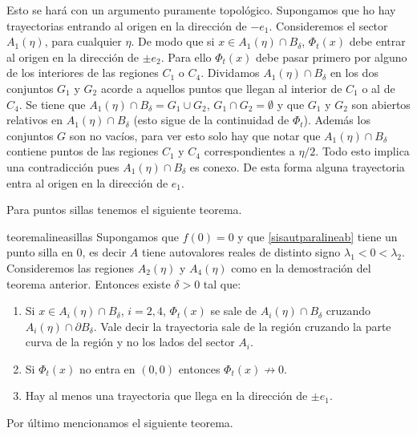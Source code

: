 \begin{demo}
 Esto se hará con
un argumento puramente topológico. Supongamos que ho hay
trayectorias entrando al origen en la dirección de $-e_1$.
Consideremos el sector $A_1(\eta)$, para cualquier $\eta$. De modo
que si $x\in A_1(\eta)\cap B_{\delta}$, $\Phi_t(x)$ debe entrar al
origen en la dirección de $\pm e_2$. Para ello $\Phi_t(x)$ debe
pasar primero por alguno de los interiores de las regiones $C_1$ o
$C_4$. Dividamos $A_1(\eta)\cap B_{\delta}$ en los dos conjuntos
$G_1$ y $G_2$ acorde a aquellos puntos que llegan al interior de
$C_1$ o al de $C_4$. Se tiene que $A_1(\eta)\cap
B_{\delta}=G_1\cup G_2$, $G_1\cap G_2=\emptyset$ y que $G_1$ y
$G_2$ son abiertos relativos en $A_1(\eta)\cap B_{\delta}$ (esto
sigue de la continuidad de $\Phi_t$). Además los conjuntos $G$ son
no vacíos, para ver esto solo hay que notar que $A_1(\eta)\cap
B_{\delta}$ contiene puntos de las regiones $C_1$ y $C_4$
correspondientes a $\eta/2$. Todo esto implica una contradicción
pues $A_1(\eta)\cap B_{\delta}$ es conexo. De esta forma alguna
trayectoria entra al origen en la dirección de $e_1$.\end{demo}


Para puntos sillas tenemos el siguiente teorema.

\begin{teorema}[Sillas]{teoremalineasillas} Supongamos que $f(0)=0$ y que
\eqref{sisautparalineab} tiene un punto silla en $0$, es decir $A$
tiene autovalores reales de distinto signo
$\lambda_1<0<\lambda_2$. Consideremos las regiones $A_2(\eta)$ y
$A_4(\eta)$ como en la demostración del teorema anterior. Entonces
existe $\delta>0$ tal que:

\begin{enumerate}
       \item\label{inc1b}  Si       $x\in A_i(\eta)\cap B_{\delta}$, $i=2,4$, $\Phi_t(x)$
       se sale de  $A_i(\eta)\cap
       B_{\delta}$ cruzando  $A_i(\eta)\cap \partial B_{\delta}$.
       Vale decir la trayectoria  sale de la región
       cruzando la parte curva de la región y no los lados del
       sector $A_i$.
        \item\label{inc2b} Si  $\Phi_t(x)$ no entra en $(0,0)$ entonces $\Phi_t(x)\nrightarrow 0$.
        \item\label{inc3b}  Hay al menos una trayectoria que llega en la dirección de
        $\pm e_1$.
\end{enumerate}
\end{teorema}


Por último mencionamos el siguiente teorema.

